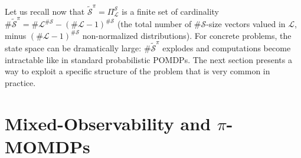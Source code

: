 Let us recall now that $\tilde{\mathcal{S}}^{\pi} = \Pi^{\mathcal{S}}_{\mathcal{L}}$ 
is a finite set of cardinality $\# \tilde{\mathcal{S}}^{\pi} = \# \mathcal{L}^{\# \mathcal{S}} - (\# \mathcal{L}-1)^{\# \mathcal{S}}$ 
(the total number of $\# \mathcal{S}$-size vectors valued in $\mathcal{L}$, minus $(\# \mathcal{L}-1)^{\# \mathcal{S}}$ non-normalized distributions).
For concrete problems, the state space can be dramatically large: $\# \tilde{\mathcal{S}}^{\pi}$ explodes and computations become intractable like in standard probabilistic POMDPs. The next section presents a way to exploit a specific structure of the problem that is very common in practice.
 
\section{Mixed-Observability and $\pi$-MOMDPs}
\label{sectionpiMO}

